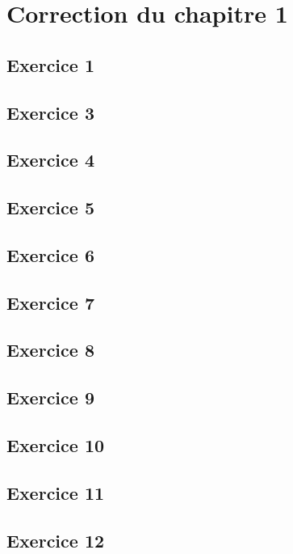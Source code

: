 \documentclass[12pt]{book}
\begin{document}
\section*{Correction du chapitre 1}

\subsection*{Exercice 1}


\subsection*{Exercice 3}


\subsection*{Exercice 4}


\subsection*{Exercice 5}


\subsection*{Exercice 6}


\subsection*{Exercice 7}


\subsection*{Exercice 8}


\subsection*{Exercice 9}

    
\subsection*{Exercice 10}


\subsection*{Exercice 11}


\subsection*{Exercice 12}
\end{document}
